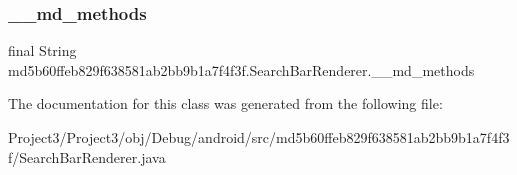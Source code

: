 \subsubsection{\texorpdfstring{\+\_\+\+\_\+md\+\_\+methods}{\_\_md\_methods}}
{\footnotesize\ttfamily final String md5b60ffeb829f638581ab2bb9b1a7f4f3f.\+Search\+Bar\+Renderer.\+\_\+\+\_\+md\+\_\+methods\hspace{0.3cm}{\ttfamily [static]}}



The documentation for this class was generated from the following file\+:\begin{DoxyCompactItemize}
\item 
Project3/\+Project3/obj/\+Debug/android/src/md5b60ffeb829f638581ab2bb9b1a7f4f3f/Search\+Bar\+Renderer.\+java\end{DoxyCompactItemize}
